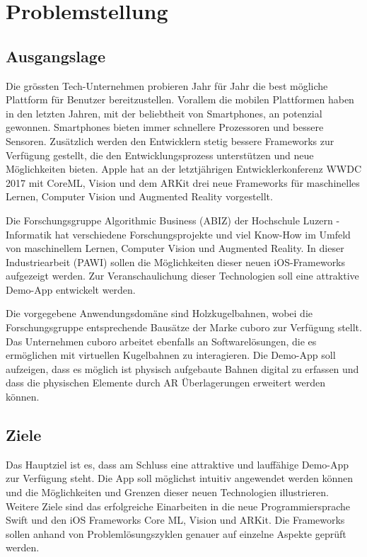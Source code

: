 \section{Problemstellung}

\subsection{Ausgangslage}

Die grössten Tech-Unternehmen probieren Jahr für Jahr die best mögliche Plattform für Benutzer bereitzustellen. Vorallem die mobilen Plattformen haben in den letzten Jahren, mit der beliebtheit von Smartphones, an potenzial gewonnen. Smartphones bieten immer schnellere Prozessoren und bessere Sensoren. Zusätzlich werden den Entwicklern stetig bessere Frameworks zur Verfügung gestellt, die den Entwicklungsprozess unterstützen und neue Möglichkeiten bieten. Apple hat an der letztjährigen Entwicklerkonferenz WWDC 2017 mit CoreML, Vision und dem ARKit drei neue Frameworks für maschinelles Lernen, Computer Vision und Augmented Reality vorgestellt.


Die Forschungsgruppe Algorithmic Business (ABIZ) der Hochschule Luzern - Informatik hat verschiedene Forschungsprojekte und viel Know-How im Umfeld von maschinellem Lernen, Computer Vision und Augmented Reality. In dieser Industriearbeit (PAWI) sollen die Möglichkeiten dieser neuen iOS-Frameworks aufgezeigt werden. Zur Veranschaulichung dieser Technologien soll eine attraktive Demo-App entwickelt werden. 


Die vorgegebene Anwendungsdomäne sind Holzkugelbahnen, wobei die Forschungsgruppe entsprechende Bausätze der Marke cuboro zur Verfügung stellt. Das Unternehmen cuboro arbeitet ebenfalls an Softwarelösungen, die es ermöglichen mit virtuellen Kugelbahnen zu interagieren. Die Demo-App soll aufzeigen, dass es möglich ist physisch aufgebaute Bahnen digital zu erfassen und dass die physischen Elemente durch AR Überlagerungen erweitert werden können.


\subsection{Ziele}
Das Hauptziel ist es, dass am Schluss eine attraktive und lauffähige Demo-App zur Verfügung steht. Die App soll möglichst intuitiv angewendet werden können und die Möglichkeiten und Grenzen dieser neuen Technologien illustrieren. Weitere Ziele sind das erfolgreiche Einarbeiten in die neue Programmiersprache Swift und den iOS Frameworks Core ML, Vision und ARKit. Die Frameworks sollen anhand von Problemlösungszyklen genauer auf einzelne Aspekte geprüft werden.


